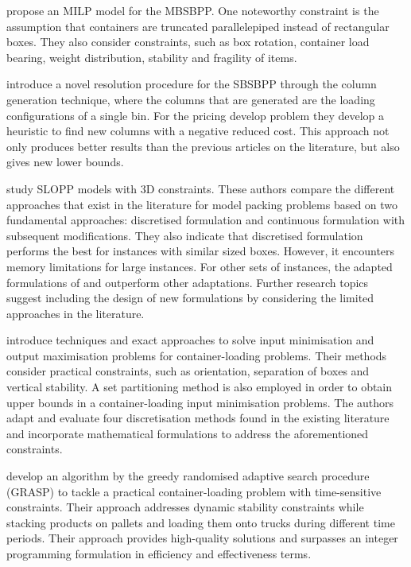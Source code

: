 \autocite{2016Paquay} propose an MILP model for the MBSBPP.  One noteworthy constraint is the assumption that containers are truncated parallelepiped instead of rectangular boxes. They also consider constraints, such as box rotation, container load bearing, weight distribution, stability and fragility of items.

\autocite{Mahvash2018} introduce a novel resolution procedure for the SBSBPP through the column generation technique, where the columns that are generated are the loading configurations of a single bin. For the pricing develop problem they develop a heuristic to find new columns with a negative reduced cost.  This approach not only produces better results than the previous articles on the literature, but also gives new lower bounds.




\autocite{Silva2019ExactProblems} study SLOPP models with 3D constraints. These authors compare the different approaches that exist in the literature for model packing problems based on two fundamental approaches: discretised formulation \autocite{Junqueira2013AnConstraints} and continuous formulation \autocite{Chen1995EUROPEANProblem} with subsequent modifications. They also indicate that discretised formulation\autocite{Junqueira2012MIP-basedConstraints} performs the best for instances with similar sized boxes. However, it encounters memory limitations for large instances. For other sets of instances, the adapted formulations of \autocite{Chen1995EUROPEANProblem} and \autocite{2016Paquay} outperform other adaptations. Further research topics suggest including the design of new formulations by considering the limited approaches in the literature.



\autocite{Kurpel2020TheProblems} introduce techniques and exact approaches to solve input minimisation and output maximisation problems for container-loading problems. Their methods consider practical constraints, such as orientation, separation of boxes and vertical stability. A set partitioning method is also employed in order to obtain upper bounds in a  container-loading input minimisation problems. The authors adapt and evaluate four discretisation methods found in the existing literature and incorporate mathematical formulations to address the aforementioned constraints.



\autocite{Alonso2020AConstraints} develop an algorithm by the greedy randomised adaptive search procedure (GRASP) to tackle a practical container-loading problem with time-sensitive constraints. Their approach addresses dynamic stability constraints while stacking products on pallets and loading them onto trucks during different time periods. Their approach provides high-quality solutions and surpasses an integer programming formulation in efficiency and effectiveness terms.

